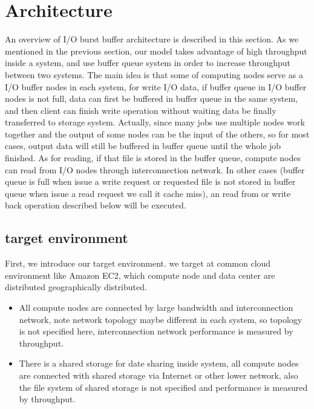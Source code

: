 \section{Architecture}
\label{sec:architecture}

An overview of I/O burst buffer architecture is described in this section.
As we mentioned in the previous section, our model takes advantage of high throughput inside a system, and use buffer queue system in order to increase throughput between two systems.
The main idea is that some of computing nodes serve as a I/O buffer nodes in each system, for write I/O data, if buffer queue in I/O buffer nodes is not full, data can first be buffered in buffer queue in the same system, and then client can finish write operation without waiting data be finally transferred to storage system.
Actually, since many jobs use multiple nodes work together and the output of some nodes can be the
input of the others, so for most cases, output data will still be buffered in buffer queue until the whole job finished.
As for reading, if that file is stored in the buffer queue, compute nodes can read from I/O nodes through interconnection network.
In other cases (buffer queue is full when issue a write request or requested file is not stored in buffer queue when issue a read request we call it cache miss), an read from or write back operation described below will be executed. 

\subsection{target environment}
First, we introduce our target environment.
we target at common cloud environment like Amazon EC2, which compute node and data center are distributed geographically distributed.

\begin{itemize}
	\item All compute nodes are connected by large bandwidth and interconnection network, note network topology maybe different in each system, so topology is not specified here, interconnection network performance is measured by throughput.
	\item There is a shared storage for date sharing inside system, all compute nodes are connected with shared storage via Internet or other lower network, also the file system of shared storage is not specified and performance is measured by throughput.
\end{itemize}

